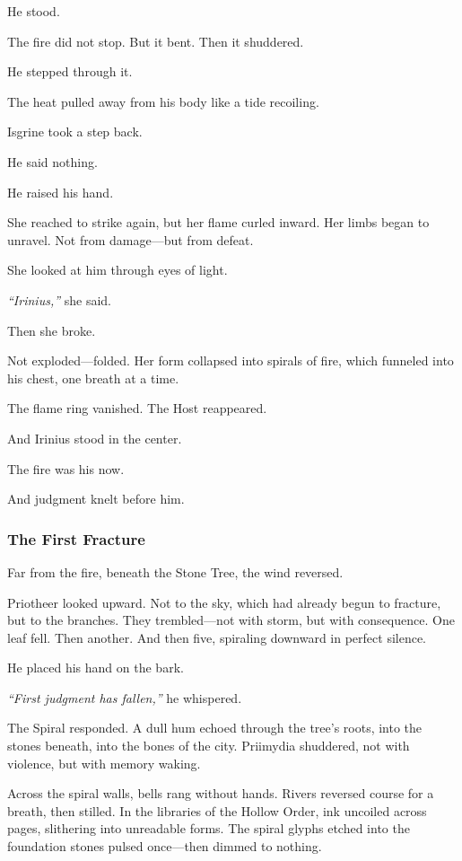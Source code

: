 \documentclass[12pt]{article}
\begin{document}
He stood.

The fire did not stop. But it bent. Then it shuddered.

He stepped through it.

The heat pulled away from his body like a tide recoiling.

Isgrine took a step back.

He said nothing.

He raised his hand.

She reached to strike again, but her flame curled inward. Her limbs began to unravel. Not from damage—but from defeat.

She looked at him through eyes of light.

\textit{``Irinius,''} she said.

Then she broke.

Not exploded—folded. Her form collapsed into spirals of fire, which funneled into his chest, one breath at a time.

The flame ring vanished. The Host reappeared.

And Irinius stood in the center.

The fire was his now.

And judgment knelt before him.

\dotfill

\subsubsection*{The First Fracture}

Far from the fire, beneath the Stone Tree, the wind reversed.

Priotheer looked upward. Not to the sky, which had already begun to fracture, but to the branches. They trembled—not with storm, but with consequence. One leaf fell. Then another. And then five, spiraling downward in perfect silence.

He placed his hand on the bark.

\textit{``First judgment has fallen,''} he whispered.

The Spiral responded. A dull hum echoed through the tree's roots, into the stones beneath, into the bones of the city. Priimydia shuddered, not with violence, but with memory waking.

Across the spiral walls, bells rang without hands. Rivers reversed course for a breath, then stilled. In the libraries of the Hollow Order, ink uncoiled across pages, slithering into unreadable forms. The spiral glyphs etched into the foundation stones pulsed once—then dimmed to nothing.
\end{document}

